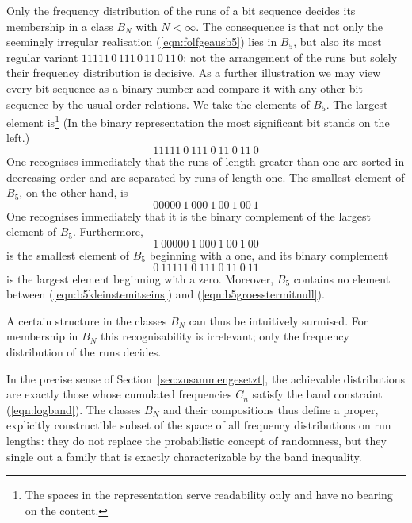 \documentclass[11pt,a4paper]{scrartcl}
\theoremstyle{plain}
\theoremstyle{definition}
\theoremstyle{remark}
\begin{document}
Only the frequency distribution of the runs of a bit sequence decides
its membership in a class $B_N$ with $N<\infty$. The consequence is
that not only the seemingly irregular realisation
(\ref{eqn:folfgeausb5}) lies in $B_5$, but also its most regular
variant $11111\,0\,111\,0\,11\,0\,11\,0$: not the arrangement of the
runs but solely their frequency distribution is decisive. As a
further illustration we may view every bit sequence as a binary number
and compare it with any other bit sequence by the usual order
relations. We take the elements of $B_5$. The largest element
is\footnote{The spaces in the representation serve readability only
and have no bearing on the content.}
(In the binary representation the most significant bit stands on
the left.)
\begin{equation}
  11111\ 0\ 111\ 0\ 11\ 0\ 11\ 0
\end{equation}
One recognises immediately that the runs of length greater than one
are sorted in decreasing order and are separated by runs of length
one. The smallest element of $B_5$, on the other hand, is
\begin{equation}
  00000\ 1\ 000\ 1\ 00\ 1\ 00\ 1
\end{equation}
One recognises immediately that it is the binary complement of the
largest element of $B_5$. Furthermore,
\begin{equation}\label{eqn:b5kleinstemitseins}
  1\ 00000\ 1\ 000\ 1\ 00\ 1\ 00
\end{equation}
is the smallest element of $B_5$ beginning with a one, and its binary
complement
\begin{equation}\label{eqn:b5groesstermitnull}
  0\ 11111\ 0\ 111\ 0\ 11\ 0\ 11
\end{equation}
is the largest element beginning with a zero. Moreover, $B_5$
contains no element between (\ref{eqn:b5kleinstemitseins}) and
(\ref{eqn:b5groesstermitnull}).

\noindent A certain structure in the classes $B_N$ can thus be
intuitively surmised. For membership in $B_N$ this recognisability is
irrelevant; only the frequency distribution of the runs decides.

In the precise sense of Section~\ref{sec:zusammengesetzt}, the
achievable distributions are exactly those whose cumulated
frequencies $C_n$ satisfy the band constraint (\ref{eqn:logband}).
The classes $B_N$ and their compositions thus define a proper,
explicitly constructible subset of the space of all frequency
distributions on run lengths: they do not replace the probabilistic
concept of randomness, but they single out a family that is exactly
characterizable by the band inequality.
\end{document}
